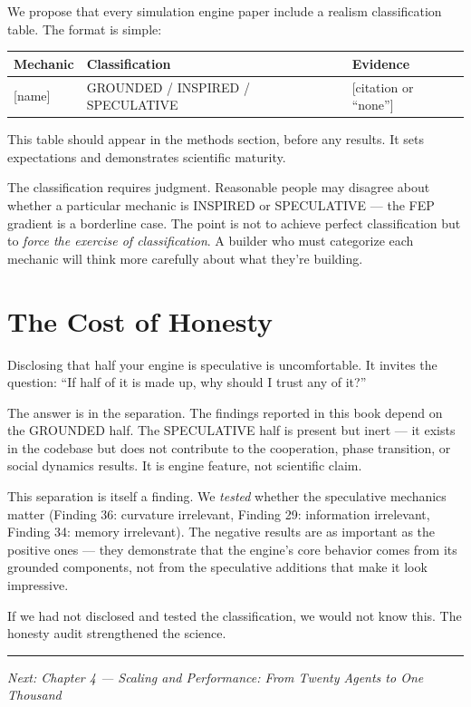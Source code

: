 We propose that every simulation engine paper include a realism classification table. The format is simple:

\begin{longtable}[]{@{}lll@{}}
\toprule\noalign{}
Mechanic & Classification & Evidence \\
\midrule\noalign{}
\endhead
\bottomrule\noalign{}
\endlastfoot
{[}name{]} & GROUNDED / INSPIRED / SPECULATIVE & {[}citation or ``none''{]} \\
\end{longtable}

This table should appear in the methods section, before any results. It sets expectations and demonstrates scientific maturity.

The classification requires judgment. Reasonable people may disagree about whether a particular mechanic is INSPIRED or SPECULATIVE --- the FEP gradient is a borderline case. The point is not to achieve perfect classification but to \emph{force the exercise of classification}. A builder who must categorize each mechanic will think more carefully about what they're building.

\section{The Cost of Honesty}\label{the-cost-of-honesty}

Disclosing that half your engine is speculative is uncomfortable. It invites the question: ``If half of it is made up, why should I trust any of it?''

The answer is in the separation. The findings reported in this book depend on the GROUNDED half. The SPECULATIVE half is present but inert --- it exists in the codebase but does not contribute to the cooperation, phase transition, or social dynamics results. It is engine feature, not scientific claim.

This separation is itself a finding. We \emph{tested} whether the speculative mechanics matter (Finding 36: curvature irrelevant, Finding 29: information irrelevant, Finding 34: memory irrelevant). The negative results are as important as the positive ones --- they demonstrate that the engine's core behavior comes from its grounded components, not from the speculative additions that make it look impressive.

If we had not disclosed and tested the classification, we would not know this. The honesty audit strengthened the science.

\begin{center}\rule{0.5\linewidth}{0.5pt}\end{center}

\emph{Next: Chapter 4 --- Scaling and Performance: From Twenty Agents to One Thousand}

